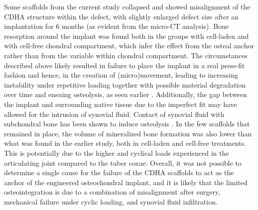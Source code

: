 \documentclass[twocolumn, serif, empirical, authordate, seplic]{jote-article}
\begin{document}
Some scaffolds from the current study collapsed and showed misalignment of the CDHA structure within the defect, with slightly enlarged defect size after an implantation for 6 months (as evident from the micro-CT analysis). Bone resorption around the implant was found both in the groups with cell-laden and with cell-free chondral compartment, which infer the effect from the osteal anchor rather than from the variable within chondral compartment. The circumstances described above likely resulted in failure to place the implant in a real press-fit fashion and hence, in the creation of (micro)movement, leading to increasing instability under repetitive loading together with possible material degradation over time and ensuing osteolysis, as seen earlier \parencite{Albrektsson2019, Goodman2019}. Additionally, the gap between the implant and surrounding native tissue due to the imperfect fit may have allowed for the intrusion of synovial fluid. Contact of synovial fluid with subchondral bone has been shown to induce osteolysis \parencite{Kold1986}. In the few scaffolds that remained in place, the volume of mineralized bone formation was also lower than what was found in the earlier study, both in cell-laden and cell-free treatments. This is potentially due to the higher and cyclical loads experienced in the articulating joint compared to the tuber coxae. Overall, it was not possible to determine a single cause for the failure of the CDHA scaffolds to act as the anchor of the engineered osteochondral implant, and it is likely that the limited osteointegration is due to a combination of misalignment after surgery, mechanical failure under cyclic loading, and synovial fluid infiltration.
\end{document}
